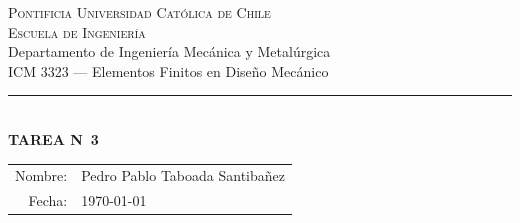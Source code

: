 \documentclass[11pt]{article}
\begin{document}
\begin{center}
    {\scshape\large Pontificia Universidad Cat\'olica de Chile}\\[2pt]
    {\scshape Escuela de Ingenier\'ia}\\[2pt]
    {\small Departamento de Ingenier\'ia Mec\'anica y Metal\'urgica}\\[2pt]
    {\small ICM 3323 --- Elementos Finitos en Dise\~no Mec\'anico}\\[10pt]
    {\color{ucred}\rule{0.42\linewidth}{0.6pt}}\\[10pt]
    {\Huge\bfseries\color{ucred} TAREA N\textdegree\ 3}
\end{center}

\vspace{4pt}
\begin{flushright}
\renewcommand{\arraystretch}{1.4}
\begin{tabular}{rl}
    Nombre: & Pedro Pablo Taboada Santiba\~nez \\
    Fecha:  & \today\\
\end{tabular}
\end{flushright}

\vspace{0.6cm}


\end{document}
